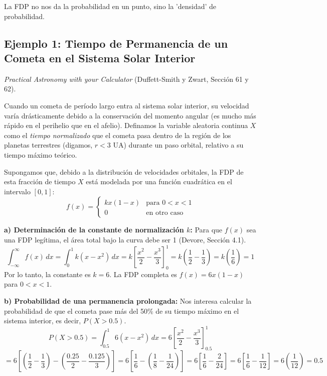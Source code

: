 La FDP no nos da la probabilidad en un punto, sino la 'densidad' de probabilidad.

\subsection{Ejemplo 1: Tiempo de Permanencia de un Cometa en el Sistema Solar Interior}

\textit{Practical Astronomy with your Calculator} (Duffett-Smith y Zwart, Sección 61 y 62). 

Cuando un cometa de período largo entra al sistema solar interior, su velocidad varía drásticamente debido a la conservación del momento angular (es mucho más rápido en el perihelio que en el afelio). Definamos la variable aleatoria continua $X$ como el \textit{tiempo normalizado} que el cometa pasa dentro de la región de los planetas terrestres (digamos, $r < 3$ UA) durante un paso orbital, relativo a su tiempo máximo teórico. 

Supongamos que, debido a la distribución de velocidades orbitales, la FDP de esta fracción de tiempo $X$ está modelada por una función cuadrática en el intervalo $[0, 1]$:
$$
f(x) = 
\begin{cases} 
k x(1 - x) & \text{para } 0 < x < 1 \\
0 & \text{en otro caso}
\end{cases}
$$

\textbf{a) Determinación de la constante de normalización $k$:}
Para que $f(x)$ sea una FDP legítima, el área total bajo la curva debe ser 1 (Devore, Sección 4.1).
$$ \int_{-\infty}^{\infty} f(x) \, dx = \int_{0}^{1} k(x - x^2) \, dx = k \left[ \frac{x^2}{2} - \frac{x^3}{3} \right]_{0}^{1} = k \left( \frac{1}{2} - \frac{1}{3} \right) = k \left( \frac{1}{6} \right) = 1 $$
Por lo tanto, la constante es $k = 6$. La FDP completa es $f(x) = 6x(1-x)$ para $0 < x < 1$.

\textbf{b) Probabilidad de una permanencia prolongada:}
Nos interesa calcular la probabilidad de que el cometa pase más del 50\% de su tiempo máximo en el sistema interior, es decir, $P(X > 0.5)$.
$$ P(X > 0.5) = \int_{0.5}^{1} 6(x - x^2) \, dx = 6 \left[ \frac{x^2}{2} - \frac{x^3}{3} \right]_{0.5}^{1} $$
$$ = 6 \left[ \left( \frac{1}{2} - \frac{1}{3} \right) - \left( \frac{0.25}{2} - \frac{0.125}{3} \right) \right] = 6 \left[ \frac{1}{6} - \left( \frac{1}{8} - \frac{1}{24} \right) \right] = 6 \left[ \frac{1}{6} - \frac{2}{24} \right] = 6 \left[ \frac{1}{6} - \frac{1}{12} \right] = 6 \left( \frac{1}{12} \right) = 0.5 $$

